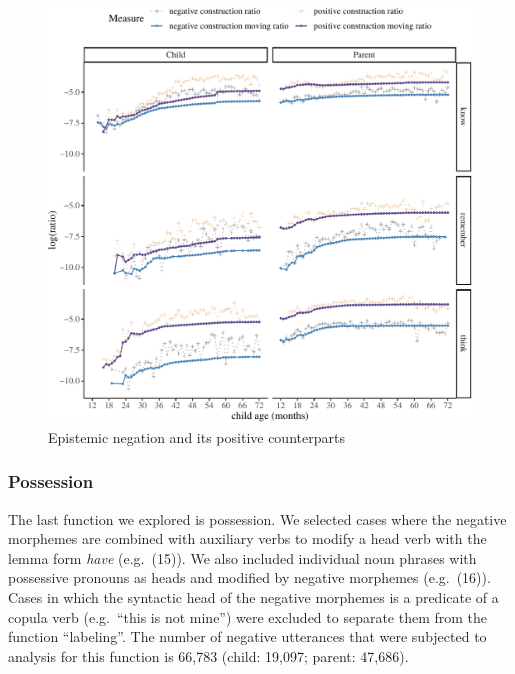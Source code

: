 \documentclass[
  english,
  man,floatsintext]{apa6}
\begin{document}
\begin{figure}[H]

{\centering \includegraphics{neg_construction_article_files/figure-latex/epistemic-1} 

}

\caption{Epistemic negation and its positive counterparts}\label{fig:epistemic}
\end{figure}

\clearpage

\hypertarget{possession}{%
\subsubsection{Possession}\label{possession}}

The last function we explored is possession. We selected cases where the negative morphemes are combined with auxiliary verbs to modify a head verb with the lemma form \emph{have} (e.g.~(15)). We also included individual noun phrases with possessive pronouns as heads and modified by negative morphemes (e.g.~(16)). Cases in which the syntactic head of the negative morphemes is a predicate of a copula verb (e.g.~\enquote{this is not mine}) were excluded to separate them from the function \enquote{labeling}. The number of negative utterances that were subjected to analysis for this function is 66,783 (child: 19,097; parent: 47,686).
\end{document}
